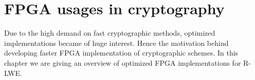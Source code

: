 \chapter{FPGA usages in cryptography\label{FPGA_crypto}}
Due to the high demand on fast cryptographic methods, optimized implementations
became of huge interest. Hence the motivation behind developing faster FPGA
implementation of cryptographic schemes. In this chapter we are giving an
overview of optimized FPGA implementations for R-LWE.
